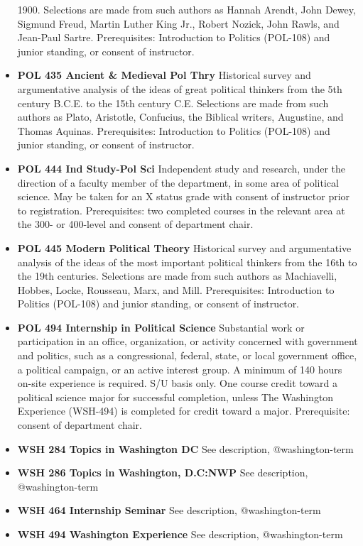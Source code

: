 \documentclass[
  letterpaper,
]{scrbook}
\begin{document}
\begin{itemize}
  1900. Selections are made from such authors as Hannah Arendt, John
  Dewey, Sigmund Freud, Martin Luther King Jr., Robert Nozick, John
  Rawls, and Jean-Paul Sartre. Prerequisites: Introduction to Politics
  (POL-108) and junior standing, or consent of instructor.
\item
  \textbf{POL 435 Ancient \& Medieval Pol Thry} Historical survey and
  argumentative analysis of the ideas of great political thinkers from
  the 5th century B.C.E. to the 15th century C.E. Selections are made
  from such authors as Plato, Aristotle, Confucius, the Biblical
  writers, Augustine, and Thomas Aquinas. Prerequisites: Introduction to
  Politics (POL-108) and junior standing, or consent of instructor.\\
\item
  \textbf{POL 444 Ind Study-Pol Sci} Independent study and research,
  under the direction of a faculty member of the department, in some
  area of political science. May be taken for an X status grade with
  consent of instructor prior to registration. Prerequisites: two
  completed courses in the relevant area at the 300- or 400-level and
  consent of department chair.
\item
  \textbf{POL 445 Modern Political Theory} Historical survey and
  argumentative analysis of the ideas of the most important political
  thinkers from the 16th to the 19th centuries. Selections are made from
  such authors as Machiavelli, Hobbes, Locke, Rousseau, Marx, and Mill.
  Prerequisites: Introduction to Politics (POL-108) and junior standing,
  or consent of instructor.
\item
  \textbf{POL 494 Internship in Political Science} Substantial work or
  participation in an office, organization, or activity concerned with
  government and politics, such as a congressional, federal, state, or
  local government office, a political campaign, or an active interest
  group. A minimum of 140 hours on-site experience is required. S/U
  basis only. One course credit toward a political science major for
  successful completion, unless The Washington Experience (WSH-494) is
  completed for credit toward a major. Prerequisite: consent of
  department chair.
\item
  \textbf{WSH 284 Topics in Washington DC} See description,
  @washington-term
\item
  \textbf{WSH 286 Topics in Washington, D.C:NWP} See description,
  @washington-term
\item
  \textbf{WSH 464 Internship Seminar} See description, @washington-term
\item
  \textbf{WSH 494 Washington Experience} See description,
  @washington-term
\end{itemize}
\end{document}
